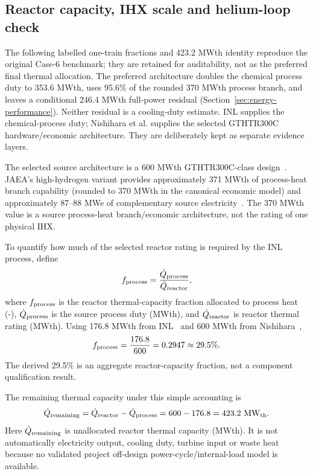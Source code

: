 \subsection{Reactor capacity, IHX scale and helium-loop check}
The following labelled one-train fractions and 423.2 MWth identity reproduce the original Case-6 benchmark; they are retained for auditability, not as the preferred final thermal allocation. The preferred architecture doubles the chemical process duty to 353.6 MWth, uses 95.6\% of the rounded 370 MWth process branch, and leaves a conditional 246.4 MWth full-power residual (Section~\ref{sec:energy-performance}). Neither residual is a cooling-duty estimate.
INL supplies the chemical-process duty; Nishihara et al. supplies the selected GTHTR300C hardware/economic architecture. They are deliberately kept as separate evidence layers.

The selected source architecture is a 600 MWth GTHTR300C-class design~\cite{nishihara2007potential}. JAEA's high-hydrogen variant provides approximately 371 MWth of process-heat branch capability (rounded to 370 MWth in the canonical economic model) and approximately 87--88 MWe of complementary source electricity~\cite{nishihara2007potential}. The 370 MWth value is a source process-heat branch/economic architecture, not the rating of one physical IHX.

To quantify how much of the selected reactor rating is required by the INL process, define
\begin{equation}\label{eq:reactor-process-fraction}
f_{\rm process}=\frac{\dot Q_{\rm process}}{\dot Q_{\rm reactor}},
\end{equation}
where $f_{\rm process}$ is the reactor thermal-capacity fraction allocated to process heat (-), $\dot Q_{\rm process}$ is the source process duty (MWth), and $\dot Q_{\rm reactor}$ is reactor thermal rating (MWth). Using 176.8 MWth from INL~\cite{inltev961} and 600 MWth from Nishihara~\cite{nishihara2007potential},
\begin{equation}\label{eq:reactor-process-fraction-sub}
f_{\rm process}=\frac{176.8}{600}=0.2947\approx29.5\%.
\end{equation}
The derived 29.5\% is an aggregate reactor-capacity fraction, not a component qualification result.

The remaining thermal capacity under this simple accounting is
\begin{equation}\label{eq:remaining-thermal}
\dot Q_{\rm remaining}=\dot Q_{\rm reactor}-\dot Q_{\rm process}
=600-176.8=423.2~\mathrm{MW_{th}}.
\end{equation}
Here $\dot Q_{\rm remaining}$ is unallocated reactor thermal capacity (MWth). It is not automatically electricity output, cooling duty, turbine input or waste heat because no validated project off-design power-cycle/internal-load model is available.

